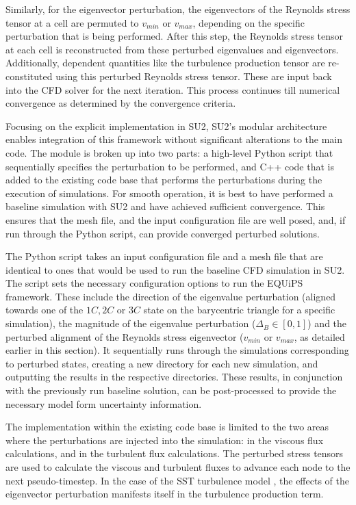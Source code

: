 Similarly, for the eigenvector perturbation, the eigenvectors of the Reynolds stress tensor at a cell are permuted to $v_{min}$ or $v_{max}$, depending on the specific perturbation that is being performed.  After this step, the Reynolds stress tensor at each cell is reconstructed from these perturbed eigenvalues and eigenvectors. Additionally, dependent quantities like the turbulence production tensor are re-constituted using this perturbed Reynolds stress tensor. These are input back into the CFD solver for the next iteration. This process continues till numerical convergence as determined by the convergence criteria. 

Focusing on the explicit implementation in SU2, SU2's modular architecture enables integration of this framework without significant alterations to the main code. The module is broken up into two parts: a high-level Python script that sequentially specifies the perturbation to be performed, and C++ code that is added to the existing code base that performs the perturbations during the execution of simulations. For smooth operation, it is best to have performed a baseline simulation with SU2 and have achieved sufficient convergence. This ensures that the mesh file, and the input configuration file are well posed, and, if run through the Python script, can provide converged perturbed solutions.

The Python script takes an input configuration file and a mesh file that are identical to ones that would be used to run the baseline CFD simulation in SU2. The script sets the necessary configuration options to run the EQUiPS framework. These include the direction of the eigenvalue perturbation (aligned towards one of the $1C, 2C$ or $3C$ state on the barycentric triangle for a specific simulation), the magnitude of the eigenvalue perturbation ($\Delta_{B} \in [0,1]$) and the perturbed alignment of the Reynolds stress eigenvector ($v_{min}$ or $v_{max}$, as detailed earlier in this section).  It sequentially runs through the simulations corresponding to perturbed states, creating a new directory for each new simulation, and outputting the results in the respective directories. These results, in conjunction with the previously run baseline solution, can be post-processed to provide the necessary model form uncertainty information. 

The implementation within the existing code base is limited to the two areas where the perturbations are injected into the simulation: in the viscous flux calculations, and in the turbulent flux calculations. The perturbed stress tensors are used to calculate the viscous and turbulent fluxes to advance each node to the next pseudo-timestep. In the case of the SST turbulence model \cite{sst}, the effects of the eigenvector perturbation manifests itself in the turbulence production term. 

